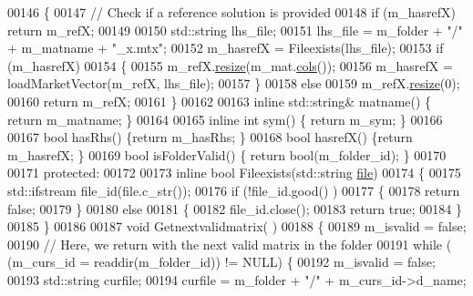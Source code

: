 \begin{DoxyCode}
00146     \{ 
00147       \textcolor{comment}{// Check if a reference solution is provided}
00148       \textcolor{keywordflow}{if} (m\_hasrefX) \textcolor{keywordflow}{return} m\_refX;
00149       
00150       std::string lhs\_file;
00151       lhs\_file = m\_folder + \textcolor{stringliteral}{"/"} + m\_matname + \textcolor{stringliteral}{"\_x.mtx"}; 
00152       m\_hasrefX = Fileexists(lhs\_file);
00153       \textcolor{keywordflow}{if} (m\_hasrefX)
00154       \{
00155         m\_refX.\hyperlink{class_eigen_1_1_plain_object_base_a99d9054ee2d5a40c6e00ded0265e9cea}{resize}(m\_mat.\hyperlink{group___sparse_core___module_aa391750e3c530227e4a5c3c52e959975}{cols}());
00156         m\_hasrefX = loadMarketVector(m\_refX, lhs\_file);
00157       \}
00158       \textcolor{keywordflow}{else}
00159         m\_refX.\hyperlink{class_eigen_1_1_plain_object_base_a99d9054ee2d5a40c6e00ded0265e9cea}{resize}(0);
00160       \textcolor{keywordflow}{return} m\_refX; 
00161     \}
00162     
00163     \textcolor{keyword}{inline} std::string& matname() \{ \textcolor{keywordflow}{return} m\_matname; \}
00164     
00165     \textcolor{keyword}{inline} \textcolor{keywordtype}{int} sym() \{ \textcolor{keywordflow}{return} m\_sym; \}
00166     
00167     \textcolor{keywordtype}{bool} hasRhs() \{\textcolor{keywordflow}{return} m\_hasRhs; \}
00168     \textcolor{keywordtype}{bool} hasrefX() \{\textcolor{keywordflow}{return} m\_hasrefX; \}
00169     \textcolor{keywordtype}{bool} isFolderValid() \{ \textcolor{keywordflow}{return} bool(m\_folder\_id); \}
00170     
00171   \textcolor{keyword}{protected}:
00172     
00173     \textcolor{keyword}{inline} \textcolor{keywordtype}{bool} Fileexists(std::string \hyperlink{structfile}{file})
00174     \{
00175       std::ifstream file\_id(file.c\_str());
00176       \textcolor{keywordflow}{if} (!file\_id.good() ) 
00177       \{
00178         \textcolor{keywordflow}{return} \textcolor{keyword}{false};
00179       \}
00180       \textcolor{keywordflow}{else} 
00181       \{
00182         file\_id.close();
00183         \textcolor{keywordflow}{return} \textcolor{keyword}{true};
00184       \}
00185     \}
00186     
00187     \textcolor{keywordtype}{void} Getnextvalidmatrix( )
00188     \{
00189       m\_isvalid = \textcolor{keyword}{false};
00190       \textcolor{comment}{// Here, we return with the next valid matrix in the folder}
00191       \textcolor{keywordflow}{while} ( (m\_curs\_id = readdir(m\_folder\_id)) != NULL) \{
00192         m\_isvalid = \textcolor{keyword}{false};
00193         std::string curfile;
00194         curfile = m\_folder + \textcolor{stringliteral}{"/"} + m\_curs\_id->d\_name;

\end{DoxyCode}
